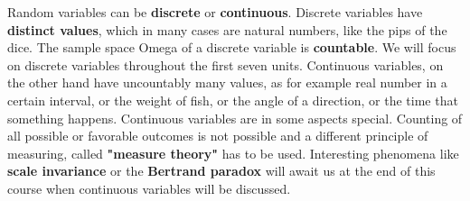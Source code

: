 \documentclass[12pt, a4paper]{scrartcl}
\begin{document}
Random variables can be \textbf{discrete} or \textbf{continuous}. 
Discrete variables have \textbf{distinct values}, which in many cases are natural numbers, like the pips of the dice. The sample space Omega of a discrete variable is \textbf{countable}. We will focus on discrete variables throughout the first seven units.
Continuous variables, on the other hand have uncountably many values, as for example real number in a certain interval, or the weight of fish, or the angle of a direction, or the time that something happens.
Continuous variables are in some aspects special. Counting of all possible or favorable outcomes is not possible and a different principle of measuring, called \textbf{"measure theory"} has to be used. Interesting phenomena like \textbf{scale invariance} or the \textbf{Bertrand paradox} will await us at the end of this course when continuous variables will be discussed.\\
\end{document}
